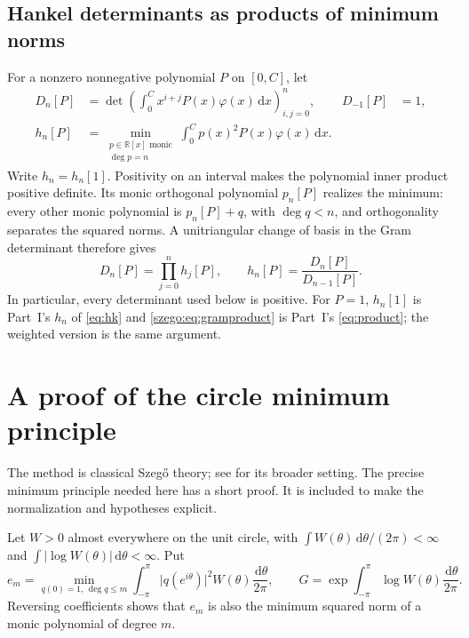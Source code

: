 \documentclass[11pt,a4paper]{article}
\numberwithin{equation}{section}
\theoremstyle{remark}\newtheorem{remark}[theorem]{Remark}
\newcommand{\dd}{\,\mathrm d}
\newcommand{\R}{\mathbb R}
\newcommand{\abs}[1]{\lvert#1\rvert}
\begin{document}
\subsection{Hankel determinants as products of minimum norms}
For a nonzero nonnegative polynomial $P$ on $[0,C]$, let
\begin{align}
 D_n[P]&=\det\!\left(\int_0^C x^{i+j}P(x)\varphi(x)\dd x\right)_{i,j=0}^n,
 &D_{-1}[P]&=1,\label{szego:eq:weightedD}\\
 h_n[P]&=\min_{\substack{p\in\R[x]\text{ monic}\\\deg p=n}}
            \int_0^C p(x)^2P(x)\varphi(x)\dd x.\label{szego:eq:minnorm}
\end{align}
Write $h_n=h_n[1]$. Positivity on an interval makes the polynomial inner
product positive definite. Its monic orthogonal polynomial $p_n[P]$ realizes
the minimum: every other monic polynomial is $p_n[P]+q$, with $\deg q<n$,
and orthogonality separates the squared norms.
A unitriangular change of basis in the Gram determinant therefore gives
\begin{equation}\label{szego:eq:gramproduct}
 D_n[P]=\prod_{j=0}^n h_j[P],\qquad
 h_n[P]=\frac{D_n[P]}{D_{n-1}[P]}.
\end{equation}
In particular, every determinant used below is positive.
For $P=1$, $h_n[1]$ is Part~I's $h_n$ of \eqref{eq:hk} and
\eqref{szego:eq:gramproduct} is Part~I's \eqref{eq:product}; the weighted
version is the same argument.

\section{A proof of the circle minimum principle}
\label{szego:sec:circle}
The method is classical Szeg\H{o} theory; see \cite{simon} for its broader
setting. The precise minimum principle needed here has a short proof.
It is included to make the normalization and hypotheses explicit.

Let $W>0$ almost everywhere on the unit circle, with
$\int W(\theta)\dd\theta/(2\pi)<\infty$ and
$\int\abs{\log W(\theta)}\dd\theta<\infty$. Put
\begin{equation}\label{szego:eq:prediction}
 e_m=\min_{q(0)=1,\,\deg q\leq m}
       \int_{-\pi}^{\pi}\abs{q(e^{i\theta})}^2W(\theta)\frac{\dd\theta}{2\pi},
 \qquad G=\exp\!\int_{-\pi}^{\pi}\log W(\theta)\frac{\dd\theta}{2\pi}.
\end{equation}
Reversing coefficients shows that $e_m$ is also the minimum squared norm
of a monic polynomial of degree $m$.
\end{document}
